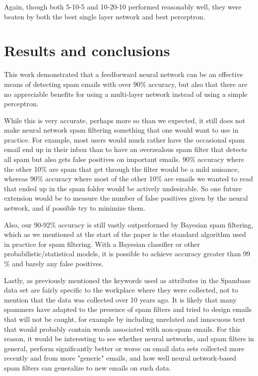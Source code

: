 \documentclass[11pt]{article} %
\begin{document}
\bigskip
Again, though both 5-10-5 and 10-20-10 performed reasonably well, they were beaten by both the best single layer network and best perceptron.

\section{Results and conclusions}

This work demonstrated that a feedforward neural network can be an effective means of detecting spam emails with over 90$\%$ accuracy, but also that there are no appreciable benefits for using a multi-layer network instead of using a simple perceptron.

While this is very accurate, perhaps more so than we expected, it still does not make neural network spam filtering something that one would want to use in practice. For example, most users would much rather have the occasional spam email end up in their inbox than to have an overzealous spam filter that detects all spam but also gets false positives on important emails. 90$\%$ accuracy where the other 10$\%$ are spam that get through the filter would be a mild nuisance, whereas 90$\%$ accuracy where most of the other 10$\%$ are emails we wanted to read that ended up in the spam folder would be actively undesirable. So one future extension would be to measure the number of false positives given by the neural network, and if possible try to minimize them.

Also, our 90-92$\%$ accuracy is still vastly outperformed by Bayesian spam filtering, which as we mentioned at the start of the paper is the standard algorithm used in practice for spam filtering. With a Bayesian classifier or other probabilistic/statistical models, it is possible to achieve accuracy greater than 99$\%$ and barely any false positives.

Lastly, as previously mentioned the keywords used as attributes in the Spambase data set are fairly specific to the workplace where they were collected, not to mention that the data was collected over 10 years ago. It is likely that many spammers have adapted to the presence of spam filters and tried to design emails that will not be caught, for example by including unrelated and innocuous text that would probably contain words associated with non-spam emails. For this reason, it would be interesting to see whether neural networks, and spam filters in general, perform significantly better or worse on email data sets collected more recently and from more "generic" emails, and how well neural network-based spam filters can generalize to new emails on such data.
\end{document}
